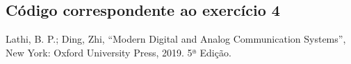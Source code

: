 \documentclass[a4paper,12pt,oneside,openany,table,xcdraw]{article}
\begin{document}


\vspace{0.3cm}
\subsection{Código correspondente ao exercício 4} \label{anexo:ex4}

\vspace{0.3cm}



\newpage
\begin{thebibliography}{9} 


    Lathi, B. P.; Ding, Zhi,
    “Modern Digital and Analog Communication Systems”, New York: 
    Oxford University Press, 2019. 5ª Edição.

\end{thebibliography}
\end{document}
